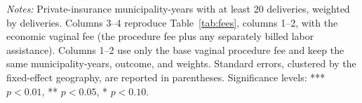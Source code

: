 
\begin{table}[H]
   \caption{\label{tab:fee_base_econ} \textbf{Fee-gap estimates using base and economic vaginal fees}}
   \centering
\small\setlength{\tabcolsep}{4pt}
\begin{minipage}{\linewidth}\footnotesize
\textit{Notes:} Private-insurance municipality-years with at least 20 deliveries, weighted by deliveries. Columns 3--4 reproduce Table~\ref{tab:fees}, columns 1--2, with the economic vaginal fee (the procedure fee plus any separately billed labor assistance). Columns 1--2 use only the base vaginal procedure fee and keep the same municipality-years, outcome, and weights. Standard errors, clustered by the fixed-effect geography, are reported in parentheses.
\newline
\footnotesize Significance levels: *** $p<0.01$, ** $p<0.05$, * $p<0.10$.
\end{minipage}
\end{table}


